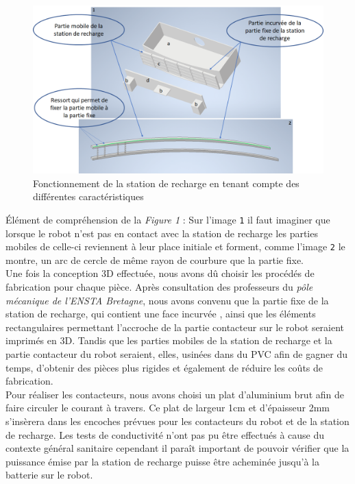 \documentclass[french]{rapportENSTAB}
\begin{document}
\begin{figure}[H]
    \centering
    \includegraphics[scale=0.6]{images/station de recharge/fonctionnement station de rehcrage.png}
    \caption{Fonctionnement de la station de recharge en tenant compte des différentes caractéristiques}
    \label{fig:station de recharge}
\end{figure}
Élément de compréhension de la \textit{Figure 1} : Sur l’image \texttt{1} il faut imaginer que lorsque le robot n’est pas en contact avec la station de recharge les parties mobiles de celle-ci reviennent à leur place initiale et forment, comme l’image \texttt{2} le montre, un arc de cercle de même rayon de courbure que la partie fixe.\\

Une fois la conception 3D effectuée, nous avons dû choisir les procédés de fabrication pour chaque pièce. Après consultation des professeurs du \textit{pôle mécanique de l'ENSTA Bretagne}, nous avons convenu que la partie fixe de la station de recharge, qui contient une face incurvée , ainsi que les éléments rectangulaires permettant l'accroche de la partie contacteur sur le robot  seraient imprimés en 3D. Tandis que les parties mobiles de la station de recharge  et la partie contacteur du robot  seraient, elles, usinées dans du PVC afin de gagner du temps, d'obtenir des pièces plus rigides et également de réduire les coûts de fabrication. \\

Pour réaliser les contacteurs, nous avons choisi un plat d'aluminium brut afin de faire circuler le courant à travers. Ce plat de largeur 1cm et d'épaisseur 2mm s'insèrera dans les encoches prévues pour les contacteurs du robot et de la station de recharge. Les tests de conductivité n'ont pas pu être effectués à cause du contexte général sanitaire cependant il paraît important de pouvoir vérifier que la puissance émise par la station de recharge puisse être acheminée jusqu'à la batterie sur le robot. \\
\end{document}

